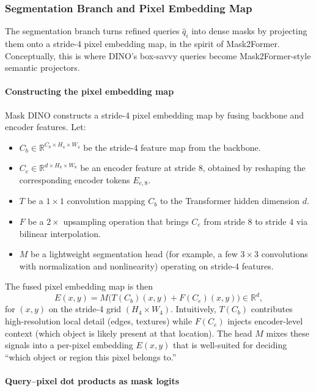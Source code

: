 \begin{enrichment}
\begin{enrichment}
		\subsubsection{Segmentation Branch and Pixel Embedding Map}
		
		The segmentation branch turns refined queries $\hat q_i$ into dense masks by projecting them onto a stride-4 pixel embedding map, in the spirit of Mask2Former.
		Conceptually, this is where DINO's box-savvy queries become Mask2Former-style semantic projectors.
		
		\paragraph{Constructing the pixel embedding map}
		
		Mask DINO constructs a stride-4 pixel embedding map by fusing backbone and encoder features.
		Let:
		\begin{itemize}
			\item $C_b \in \mathbb{R}^{C_b \times H_4 \times W_4}$ be the stride-4 feature map from the backbone.
			\item $C_e \in \mathbb{R}^{d \times H_8 \times W_8}$ be an encoder feature at stride $8$, obtained by reshaping the corresponding encoder tokens $E_{e,8}$.
			\item $T$ be a $1\times 1$ convolution mapping $C_b$ to the Transformer hidden dimension $d$.
			\item $F$ be a $2\times$ upsampling operation that brings $C_e$ from stride $8$ to stride $4$ via bilinear interpolation.
			\item $M$ be a lightweight segmentation head (for example, a few $3\times 3$ convolutions with normalization and nonlinearity) operating on stride-4 features.
		\end{itemize}
		The fused pixel embedding map is then
		\begin{equation}
			E(x,y) = M\bigl(T(C_b)(x,y) + F(C_e)(x,y)\bigr) \in \mathbb{R}^d,
			\label{eq:chapter15_maskdino_pixel_map}
		\end{equation}
		for $(x,y)$ on the stride-4 grid $(H_4 \times W_4)$.
		Intuitively, $T(C_b)$ contributes high-resolution local detail (edges, textures) while $F(C_e)$ injects encoder-level context (which object is likely present at that location).
		The head $M$ mixes these signals into a per-pixel embedding $E(x,y)$ that is well-suited for deciding ``which object or region this pixel belongs to.''
		
		\paragraph{Query–pixel dot products as mask logits}
		

\end{enrichment}
\end{enrichment}
